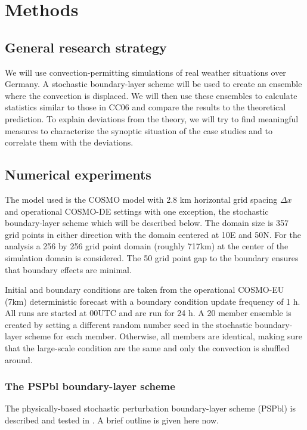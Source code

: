 \documentclass[a4paper, 12pt]{article}
\begin{document}
\section{Methods}

\subsection{General research strategy}
We will use convection-permitting simulations of real weather situations over Germany. A stochastic boundary-layer scheme will be used to create an ensemble where the convection is displaced. We will then use these ensembles to calculate statistics similar to those in CC06 and compare the results to the theoretical prediction. To explain deviations from the theory, we will try to find meaningful measures to characterize the synoptic situation of the case studies and to correlate them with the deviations.  

\subsection{Numerical experiments}
The model used is the COSMO model with 2.8 km horizontal grid spacing $\Delta x$ and operational COSMO-DE settings with one exception, the stochastic boundary-layer scheme which will be described below. The domain size is 357 grid points in either direction with the domain centered at 10E and 50N. For the analysis a 256 by 256 grid point domain (roughly 717km) at the center of the simulation domain is considered. The 50 grid point gap to the boundary ensures that boundary effects are minimal. 

Initial and boundary conditions are taken from the operational COSMO-EU (7km) deterministic forecast with a boundary condition update frequency of 1 h. All runs are started at 00UTC and are run for 24 h. A 20 member ensemble is created by setting a different random number seed in the stochastic boundary-layer scheme for each member. Otherwise, all members are identical, making sure that the large-scale condition are the same and only the convection is shuffled around. 

\subsubsection{The PSPbl boundary-layer scheme}
The physically-based stochastic perturbation boundary-layer scheme (PSPbl) is described and tested in \cite{Kober2016}. A brief outline is given here now. 
\end{document}
